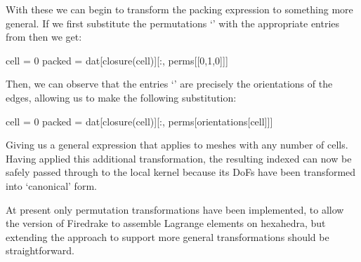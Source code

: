 \documentclass[thesis]{subfiles}
\begin{document}
With these we can begin to transform the packing expression to something more general.
If we first substitute the permutations `\pycode{[[0,1],[1,0],[0,1]]}' with the appropriate entries from  then we get:
\begin{pyinline}
  cell = 0
  packed = dat[closure(cell)][:, perms[[0,1,0]]]
\end{pyinline}
Then, we can observe that the entries `\pycode{[0,1,0]}' are precisely the orientations of the edges, allowing us to make the following substitution:
\begin{pyinline}
  cell = 0
  packed = dat[closure(cell)][:, perms[orientations[cell]]]
\end{pyinline}
Giving us a general expression that applies to meshes with any number of cells.
Having applied this additional transformation, the resulting indexed  can now be safely passed through to the local kernel because its DoFs have been transformed into `canonical' form.

At present only permutation transformations have been implemented, to allow the  version of Firedrake to assemble Lagrange elements on hexahedra, but extending the approach to support more general transformations should be straightforward.
\end{document}
